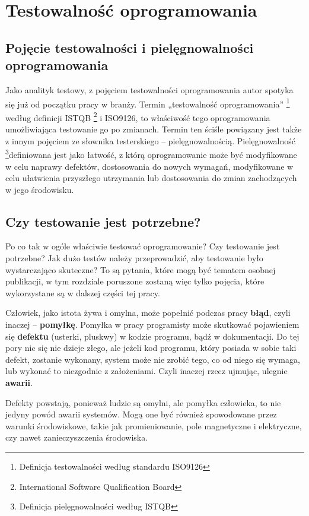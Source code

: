 \chapter{Testowalność oprogramowania}
\label{testowalnosc}
\section{Pojęcie testowalności i pielęgnowalności oprogramowania}
Jako analityk testowy, z pojęciem testowalności oprogramowania autor spotyka się już od początku pracy w branży. Termin „testowalność oprogramowania” \footnote{Definicja testowalności według standardu ISO9126}  według definicji ISTQB \footnote{International Software Qualification Board}  i ISO9126, to właściwość tego oprogramowania umożliwiająca testowanie go po zmianach. Termin ten ściśle powiązany jest także z innym pojęciem ze słownika testerskiego – pielęgnowalnością. Pielęgnowalność \footnote{Definicja pielęgnowalności według ISTQB}definiowana jest jako łatwość, z którą oprogramowanie może być modyfikowane w celu naprawy defektów, dostosowania do nowych wymagań, modyfikowane w celu ułatwienia przyszłego utrzymania lub dostosowania do zmian zachodzących w jego środowisku.

\section{Czy testowanie jest potrzebne?}
\label{czy_testowanie_potrzebne}
Po co tak w ogóle właściwie testować oprogramowanie? Czy testowanie jest potrzebne? Jak dużo testów należy przeprowadzić, aby testowanie było wystarczająco skuteczne? To są pytania, które mogą być tematem osobnej publikacji, w tym rozdziale poruszone zostaną więc tylko pojęcia, które wykorzystane są w dalszej części tej pracy.

Człowiek, jako istota żywa i omylna, może popełnić podczas pracy \textbf{błąd}, czyli inaczej – \textbf{pomyłkę}. Pomyłka w pracy programisty może skutkować pojawieniem się \textbf{defektu} (usterki, pluskwy) w kodzie programu, bądź w dokumentacji. Do tej pory nic się nie dzieje złego, ale jeżeli kod programu, który posiada w sobie taki defekt, zostanie wykonany, system może nie zrobić tego, co od niego się wymaga, lub wykonać to niezgodnie z założeniami. Czyli inaczej rzecz ujmując, ulegnie \textbf{awarii}. 

Defekty powstają, ponieważ ludzie są omylni, ale pomyłka człowieka, to nie jedyny powód awarii systemów. Mogą one być również spowodowane przez warunki środowiskowe, takie jak promieniowanie, pole magnetyczne i elektryczne, czy nawet zanieczyszczenia środowiska.

